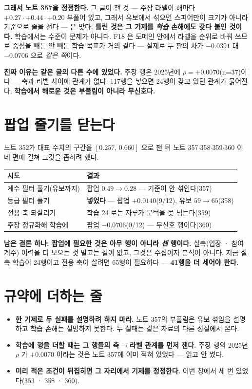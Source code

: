 \documentclass[11pt]{article}
\begin{document}
\textbf{그래서 노트 357을 정정한다.} 그 글이 잰 것 --- 주장 라벨이 해마다
$+0.27 \cdot +0.44 \cdot +0.20$ 부풀어 있고, 그래서 유보에서 섞으면
스피어만이 크기가 아니라 기준으로 줄을 선다 --- 은 맞다. \textbf{틀린 것은
그 기제를 \emph{학습} 손해에도 갖다 붙인 것이다.} 학습에서는 수준이
문제가 아니다. F18 은 도메인 안에서 라벨을 순위로 바꿔 쓰므로 중심을
빼든 안 빼든 학습 목표가 거의 같다 --- 실제로 두 판의 차가 $-0.0391$ 대
$-0.0706$ 으로 \emph{같은 쪽}이다.

\textbf{진짜 이유는 같은 글의 다른 수에 있었다.} 주장 행은 2025년에
$\rho = +0.0070$(n=37)이다 --- 축과 라벨 사이에 관계가 없다. 117행을
넣으면 24행이 갖고 있던 관계가 묽어진다. \textbf{학습에서 해로운 것은
부풀림이 아니라 무신호다.}

\section{팝업 줄기를 닫는다}

노트 352가 대표 수치의 구간을 $[0.257,\,0.660]$ 으로 잰 뒤 노트
357$\cdot$358$\cdot$359$\cdot$360 이 네 편에 걸쳐 그것을 좁히려 했다.

\begin{center}
\begin{tabular}{ll}
\hline
시도 & 결과 \\
\hline
계수 필터 풀기(유보까지) & 팝업 $0.49 \to 0.28$ --- 기준이 안 섞인다(357) \\
등급 필터 풀기           & \textbf{넣었다} --- 팝업 $+0.0140$(9/12), 유보 $59\to65$(358) \\
전용 축 되살리기         & 학습 24 로는 자루가 문턱을 못 넘는다(359) \\
주장 정규화해 학습에      & 팝업 $-0.0706$(0/12) --- 무신호 행이다(360) \\
\hline
\end{tabular}
\end{center}

\textbf{남은 결론 하나: 팝업에 필요한 것은 아무 행이 아니라 \emph{센}
행이다.} 실측(입장 · 참여 계수) 이력을 더 모으는 것 말고는 길이 없고,
그것은 수집이지 분석이 아니다. 지금 실측 학습이 24행이고 전용 축이 살려면
65행이 필요하다 --- \textbf{41행을 더 세어야 한다.}

\section{규약에 더하는 줄}

\begin{itemize}
\item \textbf{한 기제로 두 실패를 설명하려 하지 마라.} 노트 357의 부풀림은
유보 섞임을 설명하고 학습 손해는 설명하지 못한다. 두 실패는 같은 자료의
다른 성질에서 온다.
\item \textbf{학습에 행을 더할 때는 그 행들의 축$\to$라벨 관계를 먼저
잰다.} 주장 행의 2025년 $\rho$ 가 $+0.0070$ 이라는 것은 노트 357에 이미
적혀 있었다 --- 읽고 안 썼다.
\item \textbf{미리 적은 조건이 뒤집히면 그 자리에서 기제를 정정한다.}
이번 창에서 세 번 있었다(353 · 358 · 360).
\end{itemize}
\end{document}
